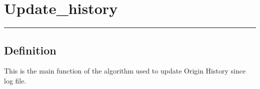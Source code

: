 \documentclass[letterpaper,10pt,english]{sphinxmanual}
\begin{document}
\sphinxstepscope

\newpage
\section{Update\_history}
\label{\detokenize{OUP/Update_history:update-history}}\label{\detokenize{OUP/Update_history::doc}}
\begin{sphinxVerbatim}[commandchars=\\\{\}]
 
\end{sphinxVerbatim}


\bigskip\hrule\bigskip



\subsection{Definition}
\label{\detokenize{OUP/Update_history:definition}}
\sphinxAtStartPar
This is the main function of the algorithm used to update Origin History since log file.
\end{document}
